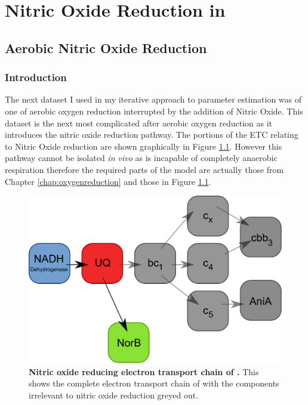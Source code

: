 \chapter{Nitric Oxide Reduction in \Nm{}}
\label{chap:noreduction}
\section{Aerobic Nitric Oxide Reduction}
\subsection{Introduction}
The next dataset I used in my iterative approach to parameter estimation was of one of aerobic oxygen reduction interrupted by the addition of Nitric Oxide. This dataset is the next most complicated after aerobic oxygen reduction as it introduces the nitric oxide reduction pathway. The portions of the ETC relating to Nitric Oxide reduction are shown graphically in Figure \ref{fig:no_resp_chain}. However this pathway cannot be isolated \textit{in vivo} as \Nm{} is incapable of completely anaerobic respiration therefore the required parts of the model are actually those from Chapter \ref{chap:oxygenreduction} and those in Figure \ref{fig:no_resp_chain}.
\begin{figure}[tbp]
  \centering
    \includegraphics[width=14cm]{06-noreduction/data/no_resp_chain.pdf}
    \caption[Nitric oxide reducing electron transport chain of \Nm{}]{{\bf Nitric oxide reducing electron transport chain of \Nm{}.} This shows the complete electron transport chain of \Nsm{} with the components irrelevant to nitric oxide reduction greyed out.
  \label{fig:no_resp_chain}}
\end{figure}
